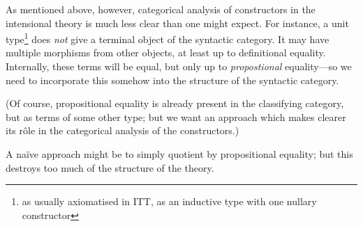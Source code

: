 \begin{para}
As mentioned above, however, categorical analysis of constructors in the intensional theory is much less clear than one might expect.  For instance, a unit type\footnote{as usually axiomatised in ITT, as an inductive type with one nullary constructor} does \emph{not} give a terminal object of the syntactic category.  It may have multiple morphisms from other objects, at least up to definitional equality.  Internally, these terms will be equal, but only up to \emph{propostional} equality---so we need to incorporate this somehow into the structure of the syntactic category.  

(Of course, propositional equality is already present in the classifying category, but as terms of some other type; but we want an approach which makes clearer its rôle in the categorical analysis of the constructors.)

A naïve approach might be to simply quotient by propositional equality; but this destroys too much of the structure of the theory. 
\end{para}

